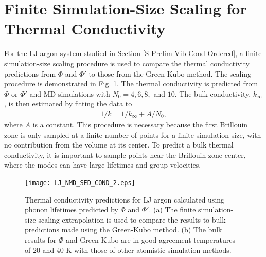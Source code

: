 \documentclass[aps,prb,preprint,superscriptaddress,amsmath,amssymb,floatfix]{revtex4}
\begin{document}
\section{\label{A-Finite-Sim}Finite Simulation-Size Scaling for Thermal Conductivity}
For the LJ argon system studied in Section \ref{S-Prelim-Vib-Cond-Ordered}, a finite simulation-size scaling procedure\cite{turney2009a,He2011a} is used to compare the thermal conductivity predictions from $\Phi$ and $\Phi'$ to those from the Green-Kubo method. The scaling procedure is demonstrated in Fig$.$ \ref{FIG:LJ_COND}. The thermal conductivity is predicted from $\Phi$ or $\Phi'$ and MD simulations with $N_0 = 4,6,8,$ and $10$. The bulk conductivity, $k_{\infty}$, is then estimated by fitting the data to
\begin{equation}\label{k_size}
\begin{split}
1/k = 1/k_{\infty} + A/N_0,
\end{split}
\end{equation}
where $A$ is a constant. This procedure is necessary because the first Brillouin zone is only sampled at a finite number of points for a finite simulation size, with no contribution from the volume at its center. To predict a bulk thermal conductivity, it is important to sample points near the Brillouin zone center, where the modes can have large lifetimes and group velocities.\cite{turney2009a,sellan2010b} 
\begin{figure}
\begin{center}
\texttt{[image: LJ\_NMD\_SED\_COND\_2.eps]}
\end{center}
\caption{\label{FIG:LJ_COND} Thermal conductivity predictions for LJ argon calculated using phonon lifetimes predicted by $\Phi$ and $\Phi'$.\cite{Larkin2012} (a) The finite simulation-size scaling extrapolation \cite{turney2009a,He2011a} is used to compare the results to bulk predictions made using the Green-Kubo method. (b) The bulk results for $\Phi$ and Green-Kubo are in good agreement temperatures of $20$ and $40$ K with those of other atomistic simulation methods.\cite{turney2009a}}
\end{figure}
\end{document}
